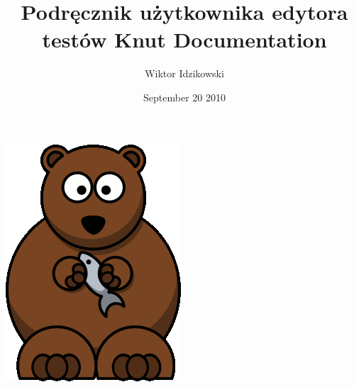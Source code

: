 \documentclass[letterpaper,10pt,polish]{sphinxmanual}
\title{Podręcznik użytkownika edytora testów Knut Documentation}
\date{September 20 2010}
\author{Wiktor Idzikowski}
\begin{document}
\maketitle
\tableofcontents
{}\label{index::doc}
{\hfill\includegraphics{Knut.gif}\hfill}
\end{document}
